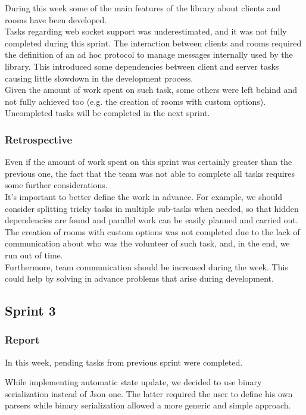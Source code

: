 During this week some of the main features of the library about clients and rooms have been developed.
\\
Tasks regarding web socket support was underestimated, and it was not fully completed during this sprint.
The interaction between clients and rooms required the definition of an ad hoc protocol to manage messages internally used by the library. This introduced some dependencies between client and server tasks causing little slowdown in the development process.
\\
Given the amount of work spent on such task, some others were left behind and not fully achieved too (e.g. the creation of rooms with custom options).
\\
Uncompleted tasks will be completed in the next sprint.



\subsubsection{Retrospective}
Even if the amount of work spent on this sprint was certainly greater than the previous one, the fact that the team was not able to complete all tasks requires some further considerations.
\\
It's important to better define the work in advance. For example, we should consider splitting tricky tasks in multiple sub-tasks when needed, so that hidden dependencies are found and parallel work can be easily planned and carried out.
\\
The creation of rooms with custom options was not completed due to the lack of communication about who was the volunteer of such task, and, in the end, we run out of time.
\\
Furthermore, team communication should be increased during the week.
This could help by solving in advance problems that arise during development.

\subsection{Sprint 3}
\subsubsection{Report}

In this week, pending tasks from previous sprint were completed.

While implementing automatic state update, we decided to use binary serialization instead of Json one. The latter required the user to define his own parsers while binary serialization allowed a more generic and simple approach.


